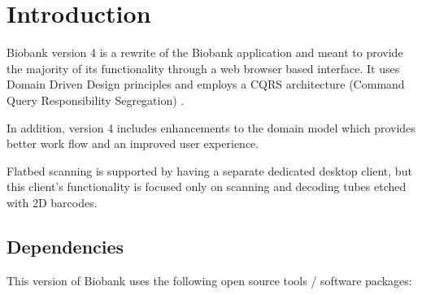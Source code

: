 \chapter{Introduction}

Biobank version 4 is a rewrite of the Biobank application and meant to provide
the majority of its functionality through a web browser based interface. It
uses Domain Driven Design principles \cite{evans2004domain} and employs a CQRS
architecture (Command Query Responsibility Segregation)
\cite{vernon2013implementing}.

In addition, version 4 includes enhancements to the domain model which provides
better work flow and an improved user experience.

Flatbed scanning is supported by having a separate dedicated desktop client,
but this client's functionality is focused only on scanning and decoding tubes
etched with 2D barcodes.

\section{Dependencies}

This version of Biobank uses the following open source tools / software packages:

